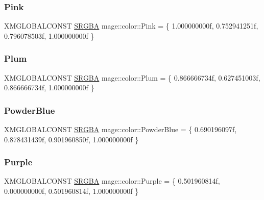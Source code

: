\hypertarget{namespacemage_1_1color_a96295d8cfec2a09119d549e085399ef2}{}\label{namespacemage_1_1color_a96295d8cfec2a09119d549e085399ef2} 
\subsubsection{\texorpdfstring{Pink}{Pink}}
{\footnotesize\ttfamily X\+M\+G\+L\+O\+B\+A\+L\+C\+O\+N\+ST \hyperlink{structmage_1_1_s_r_g_b_a}{S\+R\+G\+BA} mage\+::color\+::\+Pink = \{ 1.\+000000000f, 0.\+752941251f, 0.\+796078503f, 1.\+000000000f \}}

\hypertarget{namespacemage_1_1color_ac5193659ac991faa8044fb2b9ea21f9c}{}\label{namespacemage_1_1color_ac5193659ac991faa8044fb2b9ea21f9c} 
\subsubsection{\texorpdfstring{Plum}{Plum}}
{\footnotesize\ttfamily X\+M\+G\+L\+O\+B\+A\+L\+C\+O\+N\+ST \hyperlink{structmage_1_1_s_r_g_b_a}{S\+R\+G\+BA} mage\+::color\+::\+Plum = \{ 0.\+866666734f, 0.\+627451003f, 0.\+866666734f, 1.\+000000000f \}}

\hypertarget{namespacemage_1_1color_ac75f12ee461424dff5a031dfee8fe73b}{}\label{namespacemage_1_1color_ac75f12ee461424dff5a031dfee8fe73b} 
\subsubsection{\texorpdfstring{Powder\+Blue}{PowderBlue}}
{\footnotesize\ttfamily X\+M\+G\+L\+O\+B\+A\+L\+C\+O\+N\+ST \hyperlink{structmage_1_1_s_r_g_b_a}{S\+R\+G\+BA} mage\+::color\+::\+Powder\+Blue = \{ 0.\+690196097f, 0.\+878431439f, 0.\+901960850f, 1.\+000000000f \}}

\hypertarget{namespacemage_1_1color_a6466ea355a9d92403093523e4f9c7e6f}{}\label{namespacemage_1_1color_a6466ea355a9d92403093523e4f9c7e6f} 
\subsubsection{\texorpdfstring{Purple}{Purple}}
{\footnotesize\ttfamily X\+M\+G\+L\+O\+B\+A\+L\+C\+O\+N\+ST \hyperlink{structmage_1_1_s_r_g_b_a}{S\+R\+G\+BA} mage\+::color\+::\+Purple = \{ 0.\+501960814f, 0.\+000000000f, 0.\+501960814f, 1.\+000000000f \}}

